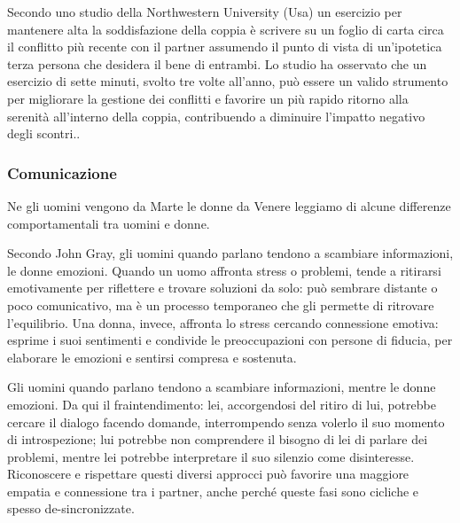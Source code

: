 \documentclass[12pt]{book} %
\begin{document}
\begin{mdframed}[linewidth=1pt]
Secondo uno studio della Northwestern University (Usa) un esercizio per mantenere alta la soddisfazione della coppia è
scrivere su un foglio di carta circa il conflitto più recente con il partner assumendo il punto di vista di
un'ipotetica terza persona che desidera il bene di entrambi. Lo studio ha osservato che un esercizio di sette minuti, svolto tre volte all'anno, può essere un valido strumento per migliorare la gestione dei conflitti e favorire un più rapido ritorno alla serenità all'interno della coppia, contribuendo a diminuire l'impatto negativo degli scontri..
\end{mdframed}

\subsubsection{Comunicazione}
Ne gli uomini vengono da Marte le donne da Venere leggiamo di alcune differenze comportamentali tra uomini e donne.

Secondo John Gray, gli uomini quando parlano tendono a scambiare informazioni, le donne emozioni. Quando un uomo affronta stress o problemi, tende a ritirarsi emotivamente per riflettere e trovare soluzioni da solo: può sembrare distante o poco comunicativo, ma è un processo temporaneo che gli permette di ritrovare l'equilibrio. Una donna, invece, affronta lo stress cercando connessione emotiva: esprime i suoi sentimenti e condivide le preoccupazioni con persone di fiducia, per elaborare le emozioni e sentirsi compresa e sostenuta.

Gli uomini quando parlano tendono a scambiare informazioni, mentre le donne emozioni. Da qui il fraintendimento: lei, accorgendosi del ritiro di lui, potrebbe cercare il dialogo facendo domande, interrompendo senza volerlo il suo momento di introspezione; lui potrebbe non comprendere il bisogno di lei di parlare dei problemi, mentre lei potrebbe interpretare il suo silenzio come disinteresse. Riconoscere e rispettare questi diversi approcci può favorire una maggiore empatia e connessione tra i partner, anche perché queste fasi sono cicliche e spesso de-sincronizzate.
\end{document}
